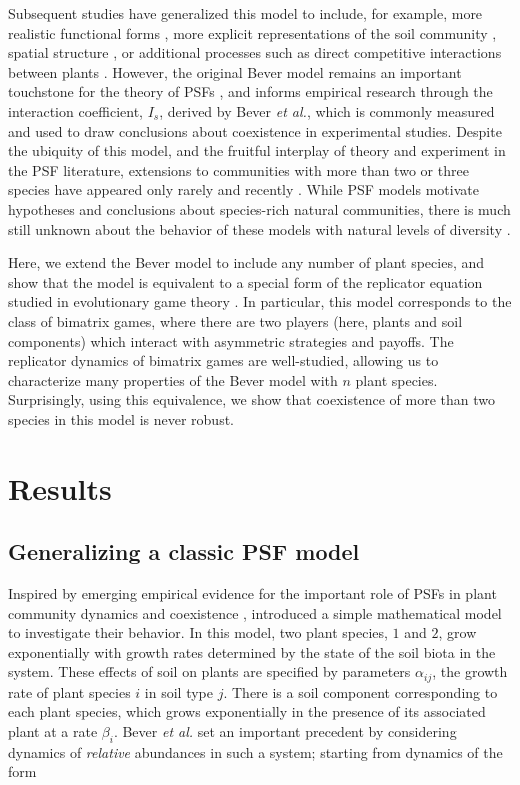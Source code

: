 \documentclass[11pt]{article}
\begin{document}
Subsequent studies have generalized this model to include, for example, more realistic functional forms \citep{umbanhowar2005simple, eppinga2006accumulation}, more explicit representations of the soil community \citep{bever2010rooting}, spatial structure \citep{eppinga2006accumulation,molofsky2002negative,suding2013consequences}, or additional processes such as direct competitive interactions between plants \citep{bever2003soil}. However, the original Bever model remains an important touchstone for the theory of PSFs \citep{ke2015incorporating,ke2020effects}, and informs empirical research through the interaction coefficient, $I_s$, derived by Bever \textit{et al.}, which is commonly measured and used to draw conclusions about coexistence in experimental studies. Despite the ubiquity of this model, and the fruitful interplay of theory and experiment in the PSF literature, extensions to communities with more than two or three species have appeared only rarely and recently \citep[but see][]{eppinga2018frequency,mack2019plant}. While PSF models motivate hypotheses and conclusions about species-rich natural communities, there is much still unknown about the behavior of these models with natural levels of diversity \citep{van2013plant}.

Here, we extend the Bever model to include any number of plant species, and show that the model is equivalent to a special form of the replicator equation studied in evolutionary game theory \citep{hofbauer1998evolutionary}. In particular, this model corresponds to the class of bimatrix games, where there are two players (here, plants and soil components) which interact with asymmetric strategies and payoffs. The replicator dynamics of bimatrix games are well-studied, allowing us to characterize many properties of the Bever model with $n$ plant species. Surprisingly, using this equivalence, we show that coexistence of more than two species in this model is never robust. 

\section{Results}

\subsection{Generalizing a classic PSF model}

Inspired by emerging empirical evidence for the important role of PSFs in plant community dynamics and coexistence \citep{van1993plant,bever1994feedback}, \citet{bever1997incorporating} introduced a simple mathematical model to investigate their behavior. In this model, two plant species, $1$ and $2$, grow exponentially with growth rates determined by the state of the soil biota in the system. These effects of soil on plants are specified by parameters $\alpha_{ij}$, the growth rate of plant species $i$ in soil type $j$. There is a soil component corresponding to each plant species, which grows exponentially in the presence of its associated plant at a rate $\beta_i$. Bever \textit{et al.} set an important precedent by considering dynamics of \emph{relative} abundances in such a system; starting from dynamics of the form
\end{document}

